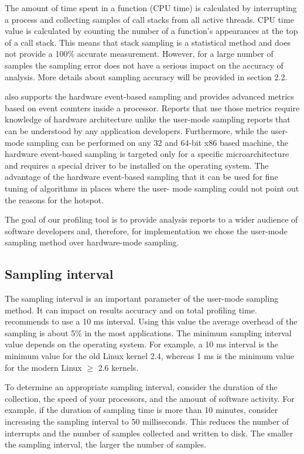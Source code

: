 The amount of time spent in a function (CPU time) is calculated by interrupting
a process and collecting samples of call stacks from all active threads. CPU
time value is calculated by counting the number of  a function's appearances at
the top of a call stack. This means that stack sampling is a statistical method
and does not provide a 100\% accurate measurement. However, for a large number
of samples the sampling error does not have a serious impact on the accuracy of
analysis. More details about sampling accuracy will be provided in section 2.2.

\amp also supports the hardware event-based sampling and provides advanced
metrics based on event counters inside a processor. Reports that use those
metrics require  knowledge of hardware architecture  unlike the user-mode
sampling reports that can be understood by any application developers.
Furthermore, while the user-mode sampling can be performed on any 32 and 64-bit
x86 based machine, the hardware event-based sampling is targeted only for a
specific \intel microarchitecture and requires a special driver to be installed
on the operating system. The advantage of the hardware event-based sampling
that it can be used for fine tuning of algorithms in places where  the user-
mode sampling could not point out the reasons for the hotspot.

The goal of our profiling tool is to provide analysis reports to a wider
audience of software developers and, therefore, for implementation we chose the
user-mode sampling method over hardware-mode sampling.

\subsection{Sampling interval}

The sampling interval is an important parameter of the user-mode sampling
method. It can impact on results accuracy and on total profiling time. \intel
recommends to use a 10 ms interval. Using this value the average overhead of
the sampling is about 5\% in the most applications. The minimum sampling
interval value depends on the operating system. For example, a 10 ms interval
is the minimum value for the old Linux kernel 2.4, whereas 1 ms is the minimum
value for the modern Linux $\ge$ 2.6 kernels.

To determine an appropriate sampling interval, consider the duration of the
collection, the speed of your processors, and the amount of software activity.
For example, if the duration of sampling time is more than 10 minutes, consider
increasing the sampling interval to 50 milliseconds. This reduces the number of
interrupts and the number of samples collected and written to disk. The smaller
the sampling interval, the larger the number of samples.

